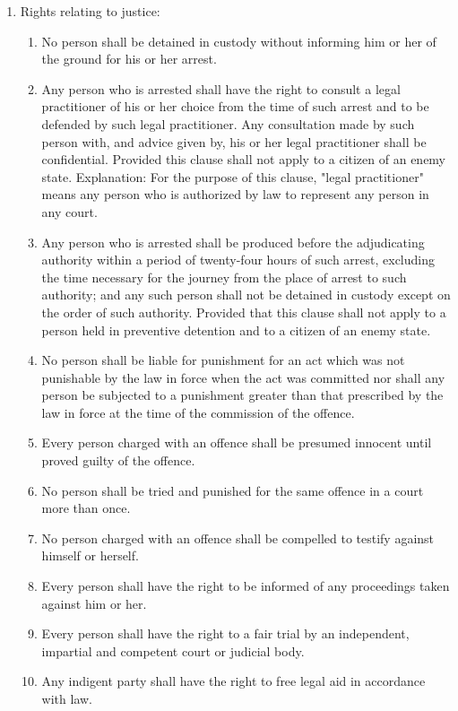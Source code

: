 \begin{questions}
\begin{solution}
\begin{enumerate}
\item Rights relating to justice:
\begin{enumerate}
    \item No person shall be detained in custody without informing him or her of the ground for his or her arrest.
    \item Any person who is arrested shall have the right to consult a legal practitioner of his or her choice from the time of such arrest and to be defended by such legal practitioner. Any consultation made by such person with, and advice given by, his or her legal practitioner shall be confidential. Provided this clause shall not apply to a citizen of an enemy state. Explanation: For the purpose of this clause, "legal practitioner" means any person who is authorized by law to represent any person in any court.
    \item Any person who is arrested shall be produced before the adjudicating authority within a period of twenty-four hours of such arrest, excluding the time necessary for the journey from the place of arrest to such authority; and any such person shall not be detained in custody except on the order of such authority. Provided that this clause shall not apply to a person held in preventive detention and to a citizen of an enemy state.
    \item No person shall be liable for punishment for an act which was not punishable by the law in force when the act was committed nor shall any person be subjected to a punishment greater than that prescribed by the law in force at the time of the commission of the offence.
    \item Every person charged with an offence shall be presumed innocent until proved guilty of the offence.
    \item No person shall be tried and punished for the same offence in a court more than once.
    \item No person charged with an offence shall be compelled to testify against himself or herself.
    \item Every person shall have the right to be informed of any proceedings taken against him or her.
    \item Every person shall have the right to a fair trial by an independent, impartial and competent court or judicial body.
    \item Any indigent party shall have the right to free legal aid in accordance with law.
\end{enumerate}


\end{enumerate}
\end{solution}
\end{questions}
